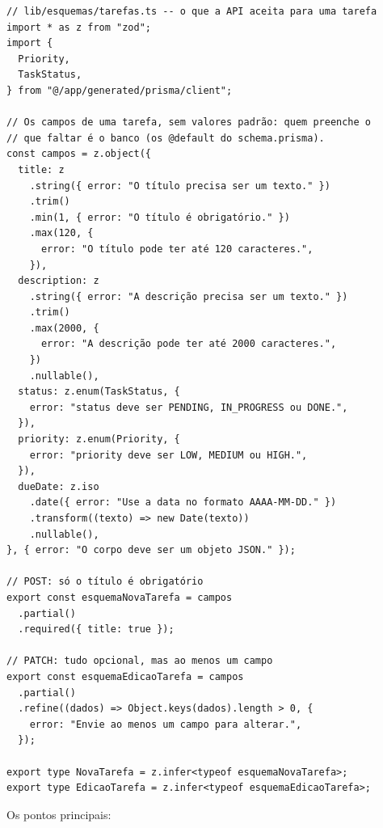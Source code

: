 \begin{codigo}
\begin{Verbatim}[breaklines=true, breaksymbolleft={}, fontsize=\footnotesize]
// lib/esquemas/tarefas.ts -- o que a API aceita para uma tarefa
import * as z from "zod";
import {
  Priority,
  TaskStatus,
} from "@/app/generated/prisma/client";

// Os campos de uma tarefa, sem valores padrão: quem preenche o
// que faltar é o banco (os @default do schema.prisma).
const campos = z.object({
  title: z
    .string({ error: "O título precisa ser um texto." })
    .trim()
    .min(1, { error: "O título é obrigatório." })
    .max(120, {
      error: "O título pode ter até 120 caracteres.",
    }),
  description: z
    .string({ error: "A descrição precisa ser um texto." })
    .trim()
    .max(2000, {
      error: "A descrição pode ter até 2000 caracteres.",
    })
    .nullable(),
  status: z.enum(TaskStatus, {
    error: "status deve ser PENDING, IN_PROGRESS ou DONE.",
  }),
  priority: z.enum(Priority, {
    error: "priority deve ser LOW, MEDIUM ou HIGH.",
  }),
  dueDate: z.iso
    .date({ error: "Use a data no formato AAAA-MM-DD." })
    .transform((texto) => new Date(texto))
    .nullable(),
}, { error: "O corpo deve ser um objeto JSON." });

// POST: só o título é obrigatório
export const esquemaNovaTarefa = campos
  .partial()
  .required({ title: true });

// PATCH: tudo opcional, mas ao menos um campo
export const esquemaEdicaoTarefa = campos
  .partial()
  .refine((dados) => Object.keys(dados).length > 0, {
    error: "Envie ao menos um campo para alterar.",
  });

export type NovaTarefa = z.infer<typeof esquemaNovaTarefa>;
export type EdicaoTarefa = z.infer<typeof esquemaEdicaoTarefa>;
\end{Verbatim}
\end{codigo}

Os pontos principais:

